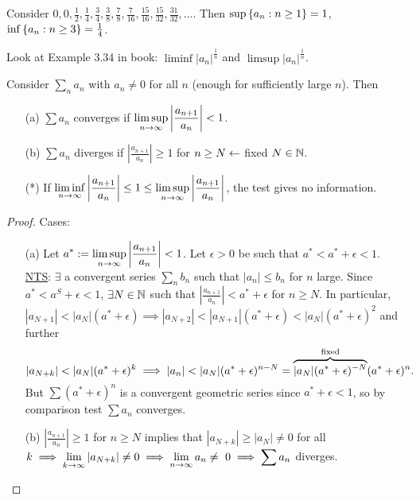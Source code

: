 \documentclass[]{article}
\begin{document}
\begin{example}
	Consider $0,0,\frac{1}{2},\frac{1}{4},\frac{3}{4},\frac{3}{8},\frac{7}{8},\frac{7}{16},\frac{15}{16},\frac{15}{32},\frac{31}{32},\dots$.
	Then $\sup\left\{ a_n : n\geq 1 \right\} = 1$, $\inf\left\{ a_n : n\geq 3 \right\}=\frac{1}{4}$.
\end{example}

\begin{example}
	Look at Example 3.34 in book: $\liminf |a_n|^\frac{1}{n}$ and $\limsup |a_n|^\frac{1}{n}$.
\end{example}

\begin{theorem}
	 Consider $\sum_n a_n$ with $a_n\neq 0$ for all $n$ (enough for sufficiently large $n$). Then
	\begin{enumerate}
		\item[(a)] $\sum a_n$ converges if $\displaystyle\limsup_{n\rightarrow\infty} \left|\frac{a_{n+1}}{a_n}\right|<1$.
		\item[(b)] $\sum a_n$ diverges if $\displaystyle\left| \frac{a_{n+1}}{a_n}\right| \geq 1$ for $n\geq N \leftarrow$ fixed $N\in\mathbb{N}$.
		\item[(*)] If $\displaystyle\liminf_{n\rightarrow\infty}\left|\frac{a_{n+1}}{a_n}\right| \leq 1 \leq \limsup_{n\rightarrow\infty}\left|\frac{a_{n+1}}{a_n}\right|$, the test gives no information.
	\end{enumerate}
	\label{thm-3-34}
\end{theorem}
\begin{proof}
	Cases:
	\begin{enumerate}
		\item[(a)] Let $\displaystyle a^*:=\limsup_{n\rightarrow\infty}\left|\frac{a_{n+1}}{a_n}\right|<1$.
			Let $\epsilon>0$ be such that $a^*<a^*+\epsilon<1$.
			\ul{NTS}: $\exists$ a convergent series $\sum_n b_n$ such that $|a_n|\leq b_n$ for $n$ large.
			Since $a^*<a^S+\epsilon<1$, $\exists N\in\mathbb{N}$ such that $\left|\frac{a_{n+1}}{a_n}\right|<a^*+\epsilon$ for $n\geq N$.
			In particular, $|a_{N+1}|<|a_N|(a^*+\epsilon) \implies |a_{N+2}|<|a_{N+1}|(a^*+\epsilon) < |a_N|(a^*+\epsilon)^2$ and further $$|a_{N+k}|<|a_N|(a^*+\epsilon)^k \implies |a_n|<|a_N|(a^*+\epsilon)^{n-N} = \ob{\text{fixed}}{|a_N|(a^*+\epsilon)^{-N}}(a^*+\epsilon)^n.$$
			But $\sum(a^*+\epsilon)^n$ is a convergent geometric series since \ul{$a^*+\epsilon<1$}, so by comparison test $\sum a_n$ converges.
		\item[(b)] $\left|\frac{a_{n+1}}{a_n}\right|\geq 1$ for $n\geq N$ implies that $|a_{N+k}|\geq |a_N|\neq 0$ for all $\displaystyle k \implies \lim_{k\rightarrow\infty} |a_{N+k}|\neq 0 \implies \lim_{n\rightarrow\infty}a_n\neq~0 \implies \sum a_n$ diverges.
\end{enumerate}
\end{proof}
\end{document}
